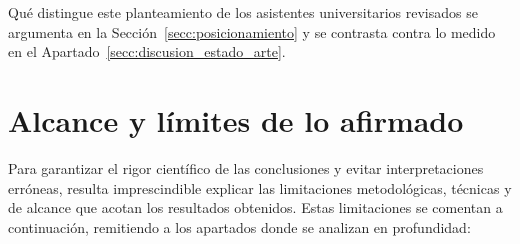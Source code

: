 Qué distingue este planteamiento de los asistentes universitarios
  revisados se argumenta en la Sección~\ref{secc:posicionamiento} y se contrasta contra lo
  medido en el Apartado~\ref{secc:discusion_estado_arte}.

\section[Alcance y límites de lo afirmado]{Alcance y límites de lo afirmado}
\label{secc:limitaciones}

Para garantizar el rigor científico de las conclusiones y evitar interpretaciones erróneas, resulta imprescindible explicar las limitaciones metodológicas, técnicas y de alcance que acotan los resultados obtenidos. Estas limitaciones se comentan a continuación, remitiendo a los apartados donde se analizan en profundidad:

